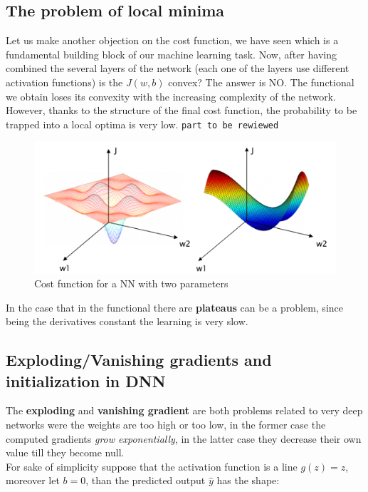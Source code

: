 \subsection{The problem of local minima}
Let us make another objection on the cost function, we have seen which is a fundamental building block of our machine learning task. Now, after having combined the several layers of the network (each one of the layers use different activation functions) is the $J(w,b)$ convex? The answer is NO. The functional we obtain loses its convexity with the increasing complexity of the network. However, thanks to the structure of the final cost function, the probability to be trapped into a local optima is very low. \texttt{part to be rewiewed}

\begin{figure}[h]
    \centering
    \includegraphics[scale=0.6]{img/Jnocvx.png}
    \caption{Cost function for a NN with two parameters}
\end{figure}
In the case that in the functional there are \textbf{plateaus} can be a problem, since being the derivatives constant the learning is very slow.

\subsection{Exploding/Vanishing gradients and initialization in DNN}
The \textbf{exploding} and \textbf{vanishing gradient} are both problems related to very deep networks were the weights are too high or too low, in the former case the computed gradients \textit{grow exponentially}, in the latter case they decrease their own value till they become null.\\
For sake of simplicity suppose that the activation function is a line $g(z)=z$, moreover let $b=0$, than the predicted output $\hat{y}$ has the shape:

